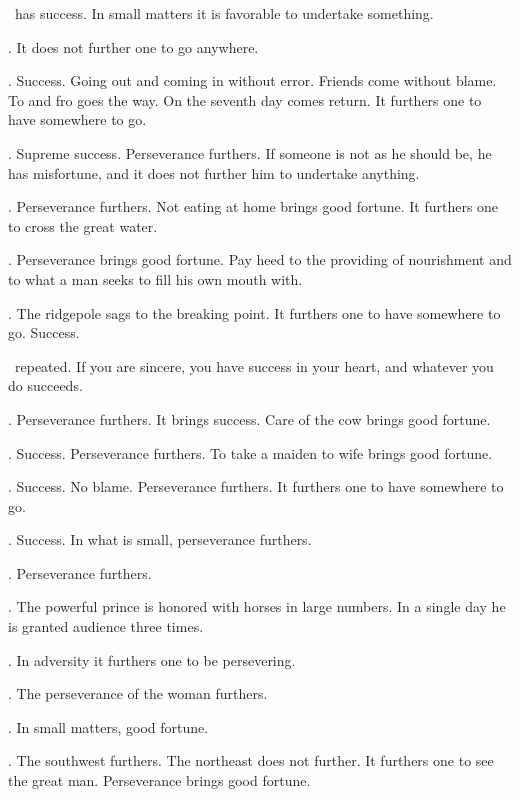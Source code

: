 {\nameit\ has success.
 In small matters
 it is favorable to undertake something.}

{\nameit. It does not further one
 to go anywhere.}

{\nameit. Success.
 Going out and coming in without error.
 Friends come without blame.
 To and fro goes the way.
 On the seventh day comes return.
 It furthers one to have somewhere to go.}

{\nameit. Supreme success.
 Perseverance furthers.
 If someone is not as he should be,
 he has misfortune,
 and it does not further him
 to undertake anything.}

{\nameit.
 Perseverance furthers.
 Not eating at home brings good fortune.
 It furthers one to cross the great water.}

{\nameit.
 Perseverance brings good fortune.
 Pay heed to the providing of nourishment
 and to what a man seeks
 to fill his own mouth with.}

{\nameit.
 The ridgepole sags to the breaking point.
 It furthers one to have somewhere to go.
 Success.}

{\nameit\ repeated.
 If you are sincere, you have success in your heart,
 and whatever you do succeeds.}

{\nameit. Perseverance furthers.
 It brings success.
 Care of the cow brings good fortune.}

{\nameit. Success.
 Perseverance furthers.
 To take a maiden to wife brings good fortune.}

{\nameit. Success. No blame.
 Perseverance furthers.
 It furthers one to have somewhere to go.}

{\nameit. Success.
 In what is small, perseverance furthers.}

{\nameit. Perseverance furthers.}

{\nameit. The powerful prince
 is honored with horses in large numbers.
 In a single day he is granted audience three times.}

{\nameit. In adversity
 it furthers one to be persevering.}

{\nameit. The perseverance of the woman furthers.}

{\nameit. In small matters, good fortune.}

{\nameit. The southwest furthers.
 The northeast does not further.
 It furthers one to see the great man.
 Perseverance brings good fortune.}

